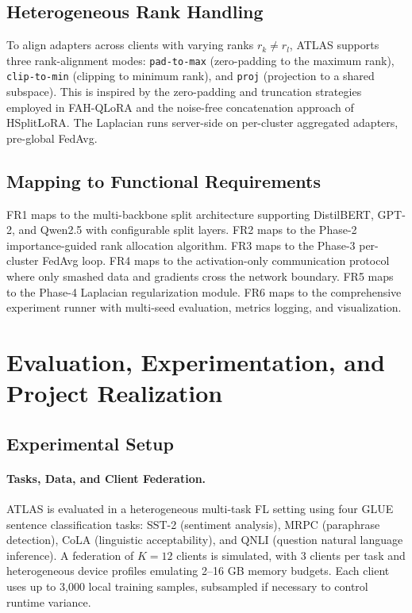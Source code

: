 \documentclass[11pt,a4paper]{article}
\begin{document}
\subsection{Heterogeneous Rank Handling}

To align adapters across clients with varying ranks $r_k \neq r_l$, ATLAS supports three rank-alignment modes: \texttt{pad-to-max} (zero-padding to the maximum rank), \texttt{clip-to-min} (clipping to minimum rank), and \texttt{proj} (projection to a shared subspace). This is inspired by the zero-padding and truncation strategies employed in FAH-QLoRA and the noise-free concatenation approach of HSplitLoRA. The Laplacian runs server-side on per-cluster aggregated adapters, pre-global FedAvg.

\subsection{Mapping to Functional Requirements}

FR1 maps to the multi-backbone split architecture supporting DistilBERT, GPT-2, and Qwen2.5 with configurable split layers. FR2 maps to the Phase-2 importance-guided rank allocation algorithm. FR3 maps to the Phase-3 per-cluster FedAvg loop. FR4 maps to the activation-only communication protocol where only smashed data and gradients cross the network boundary. FR5 maps to the Phase-4 Laplacian regularization module. FR6 maps to the comprehensive experiment runner with multi-seed evaluation, metrics logging, and visualization.


\section{Evaluation, Experimentation, and Project Realization}

\subsection{Experimental Setup}

\paragraph{Tasks, Data, and Client Federation.}
ATLAS is evaluated in a heterogeneous multi-task FL setting using four GLUE sentence classification tasks: SST-2 (sentiment analysis), MRPC (paraphrase detection), CoLA (linguistic acceptability), and QNLI (question natural language inference). A federation of $K=12$ clients is simulated, with 3 clients per task and heterogeneous device profiles emulating 2--16 GB memory budgets. Each client uses up to 3,000 local training samples, subsampled if necessary to control runtime variance.
\end{document}
